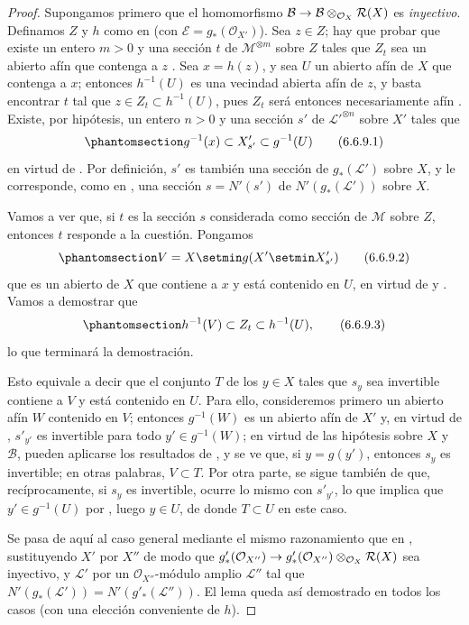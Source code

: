 \documentclass[oneside,10pt]{amsart}
\makeatletter
\newcommand{\ega@arrow}[2]{\mathchoice{#1}{#2}{#2}{#2}}
\renewcommand{\to}{\ega@arrow{\longrightarrow}{\rightarrow}}
\newcommand{\oldpage}[2][]{\marginnote{\normalfont\footnotesize\textbf{#1}~|~#2}\ignorespaces}
\let\EGAOriginalLabel\label
\renewcommand{\label}[1]{\phantomsection\EGAOriginalLabel{#1}}
\makeatother
\begin{document}
\begin{proof}
Supongamos primero que el homomorfismo
$\mathcal{B}\to
\mathcal{B}\otimes_{\mathcal{O}_X}\mathcal{R}(X)$
es \emph{inyectivo}.
Definamos $Z$ y $h$ como en  (con $\mathcal{E}=g_*(\mathcal{O}_{X'})$).
Sea $z\in Z$;
hay que probar que existe un entero $m>0$ y una sección $t$ de $\mathcal{M}^{\otimes m}$ sobre $Z$ tales que $Z_t$ sea un abierto afín que contenga a $z$ .
Sea $x=h(z)$, y sea $U$ un abierto afín de $X$ que contenga a $x$;
entonces $h^{-1}(U)$ es una vecindad abierta afín de $z$, y basta encontrar $t$ tal que
$z\in Z_t\subset h^{-1}(U)$,
pues $Z_t$ será entonces necesariamente afín .
Existe, por hipótesis, un entero $n>0$ y una sección $s'$ de ${\mathcal{L}'}^{\otimes n}$ sobre $X'$ tales que
\[
\label{II.6.6.9.1-fr}
g^{-1}(x)\subset X'_{s'}\subset g^{-1}(U)
\tag{6.6.9.1}
\]
en virtud de .
Por definición, $s'$ es también una sección de $g_*(\mathcal{L}')$ sobre $X$, y le corresponde, como en , una sección
$s=N'(s')$
de
$N'(g_*(\mathcal{L}'))$
sobre
\oldpage[II]{134}
 $X$.

Vamos a ver que, si $t$ es la sección $s$ considerada como sección de $\mathcal{M}$ sobre $Z$, entonces $t$ responde a la cuestión.
Pongamos
\[
\label{II.6.6.9.2-fr}
V=X\setmin g(X'\setmin X'_{s'})
\tag{6.6.9.2}
\]
que es un abierto de $X$ que contiene a $x$ y está contenido en $U$, en virtud de  y .
Vamos a demostrar que
\[
\label{II.6.6.9.3-fr}
h^{-1}(V)\subset Z_t\subset h^{-1}(U),
\tag{6.6.9.3}
\]
lo que terminará la demostración.

Esto equivale a decir que el conjunto $T$ de los $y\in X$ tales que $s_y$ sea invertible contiene a $V$ y está contenido en $U$.
Para ello, consideremos primero un abierto afín $W$ contenido en $V$;
entonces $g^{-1}(W)$ es un abierto afín de $X'$ y, en virtud de , $s'_{y'}$ es invertible para todo $y'\in g^{-1}(W)$;
en virtud de las hipótesis sobre $X$ y $\mathcal{B}$, pueden aplicarse los resultados de , y se ve que, si $y=g(y')$, entonces $s_y$ es invertible;
en otras palabras, $V\subset T$.
Por otra parte, se sigue también de  que, recíprocamente, si $s_y$ es invertible, ocurre lo mismo con $s'_{y'}$, lo que implica que $y'\in g^{-1}(U)$ por , luego $y\in U$, de donde $T\subset U$ en este caso.

Se pasa de aquí al caso general mediante el mismo razonamiento que en , sustituyendo $X'$ por $X''$ de modo que
$g'_*(\mathcal{O}_{X''})\to
g'_*(\mathcal{O}_{X''})\otimes_{\mathcal{O}_X}\mathcal{R}(X)$
sea inyectivo, y $\mathcal{L}'$ por un $\mathcal{O}_{X''}$-módulo amplio $\mathcal{L}''$ tal que
$N'(g_*(\mathcal{L}'))=N'(g'_*(\mathcal{L}''))$.
El lema  queda así demostrado en todos los casos (con una elección conveniente de $h$).
\end{proof}
\end{document}
